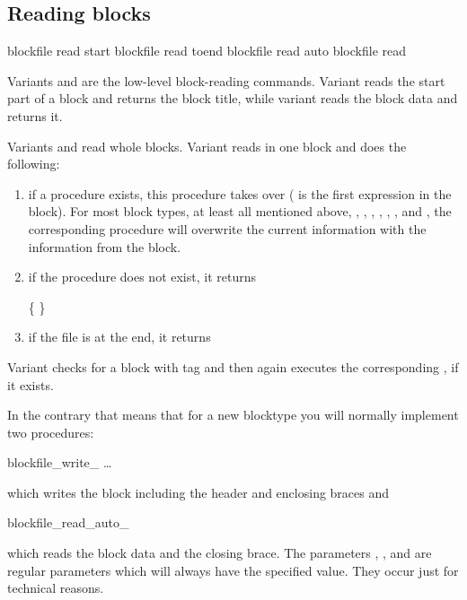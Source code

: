 \subsection{Reading blocks}

\begin{essyntax}
   blockfile  read start 
   blockfile  read toend 
   blockfile  read auto 
   blockfile  read 
\end{essyntax}

Variants  and  are the low-level block-reading
commands. Variant  reads the start part of a block and
returns the block title, while variant  reads the block
data and returns it.

Variants  and  read whole blocks.
Variant  reads in one block and does the following:
\begin{enumerate}
\item if a procedure  exists,
  this procedure takes over ( is the first expression in the
  block). For most block types, at least all mentioned above, \ie
  , , ,
  , ,
  , and , the corresponding
  procedure will overwrite the current information with the
  information from the block.
\item if the procedure does not exist, it returns 
  \begin{code}
    \{   \}
  \end{code}
\item if the file is at the end, it returns 
\end{enumerate}

Variant  checks for a block with tag  and then
again executes the corresponding ,
if it exists.

In the contrary that means that for a new blocktype you will normally
implement two procedures:
\begin{essyntaxbox}
  blockfile_write_    \dots
\end{essyntaxbox}
which writes the block including the header and enclosing braces and
\begin{essyntaxbox}
  blockfile_read_auto_   
\end{essyntaxbox}
which reads the block data and the closing brace. The parameters
, ,  and  are regular
parameters which will always have the specified value. They occur just
for technical reasons.

